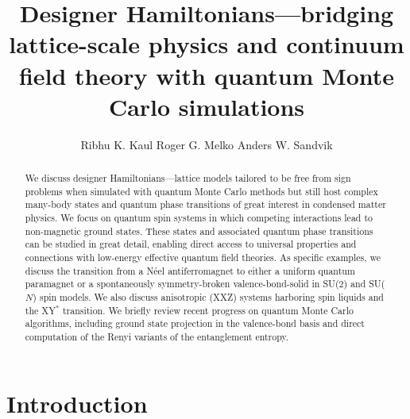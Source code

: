 \documentclass[range]{ar2e}
\begin{document}




\title{Designer Hamiltonians---bridging lattice-scale physics and continuum field theory with 
quantum Monte Carlo simulations} 

\author{Ribhu K. Kaul
Roger G. Melko
Anders W. Sandvik
}

\begin{abstract}
We discuss designer Hamiltonians---lattice models tailored to be free from sign problems when simulated with quantum 
Monte Carlo methods but still host complex  many-body states and quantum phase transitions of great interest in condensed matter 
physics. We focus on quantum spin systems in which competing interactions lead to non-magnetic ground states. These states and 
associated quantum phase transitions can be studied in great detail, enabling direct access to universal properties and connections 
with low-energy effective quantum field theories. As specific examples, we discuss the transition from a N\'eel antiferromagnet to 
either a uniform quantum paramagnet or a spontaneously symmetry-broken valence-bond-solid in SU($2$) and SU($N$) spin models. We also 
discuss anisotropic (XXZ) systems harboring spin liquids and the XY$^*$ transition. We briefly review recent progress on quantum Monte 
Carlo algorithms, including ground state projection in the valence-bond basis and direct computation of the Renyi variants of the 
entanglement entropy.
\end{abstract}

\maketitle

\section{Introduction}
\label{sec:intro}
\end{document}
